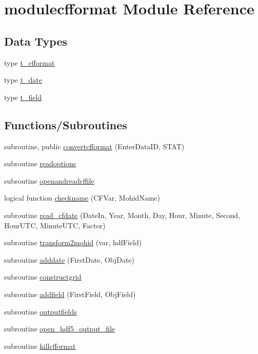 \hypertarget{namespacemodulecfformat}{}\section{modulecfformat Module Reference}
\label{namespacemodulecfformat}
\subsection*{Data Types}
\begin{DoxyCompactItemize}
\item 
type \mbox{\hyperlink{structmodulecfformat_1_1t__cfformat}{t\+\_\+cfformat}}
\item 
type \mbox{\hyperlink{structmodulecfformat_1_1t__date}{t\+\_\+date}}
\item 
type \mbox{\hyperlink{structmodulecfformat_1_1t__field}{t\+\_\+field}}
\end{DoxyCompactItemize}
\subsection*{Functions/\+Subroutines}
\begin{DoxyCompactItemize}
\item 
subroutine, public \mbox{\hyperlink{namespacemodulecfformat_a66da5c204d14d5f914e0226b731d5b00}{convertcfformat}} (Enter\+Data\+ID, S\+T\+AT)
\item 
subroutine \mbox{\hyperlink{namespacemodulecfformat_a127693205be384834843b9bb374985e3}{readoptions}}
\item 
subroutine \mbox{\hyperlink{namespacemodulecfformat_a5052b284bceadda6143b8eb5cfd48d05}{openandreadcffile}}
\item 
logical function \mbox{\hyperlink{namespacemodulecfformat_a63d0a39020a58e43589f5140948d8d58}{checkname}} (C\+F\+Var, Mohid\+Name)
\item 
subroutine \mbox{\hyperlink{namespacemodulecfformat_a76cf49362d3cf1651d95e683370014a6}{read\+\_\+cfdate}} (Date\+In, Year, Month, Day, Hour, Minute, Second, Hour\+U\+TC, Minute\+U\+TC, Factor)
\item 
subroutine \mbox{\hyperlink{namespacemodulecfformat_ada4be4f435cac7bea17a9c4f77f22009}{transform2mohid}} (var, hdf\+Field)
\item 
subroutine \mbox{\hyperlink{namespacemodulecfformat_ad6fa7957e7e1de3c2faa57ac769c05bd}{adddate}} (First\+Date, Obj\+Date)
\item 
subroutine \mbox{\hyperlink{namespacemodulecfformat_a9105e21bd9d021767ea028d72b9a201a}{constructgrid}}
\item 
subroutine \mbox{\hyperlink{namespacemodulecfformat_a86156fe637bfdd6ff49e6bce5f187595}{addfield}} (First\+Field, Obj\+Field)
\item 
subroutine \mbox{\hyperlink{namespacemodulecfformat_a369a14cc96dd6826942c93e6352240db}{outputfields}}
\item 
subroutine \mbox{\hyperlink{namespacemodulecfformat_ac77aa80bb4743d920e0a70e5b278be5d}{open\+\_\+hdf5\+\_\+output\+\_\+file}}
\item 
subroutine \mbox{\hyperlink{namespacemodulecfformat_ac518bd16572e1cf72041996bfd3d1e36}{killcfformat}}
\end{DoxyCompactItemize}
